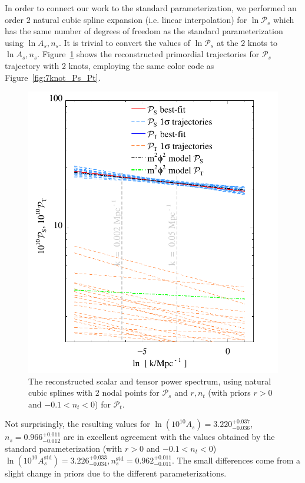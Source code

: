 \documentclass[a4paper,11pt]{article}
\newcommand{\pscalar}{{\mathcal{P}_s}}
\newcommand{\ptensor}{{\mathcal{P}_t}}
\begin{document}
In order to connect our work to the standard parameterization, we
performed an order $2$ natural cubic spline expansion (i.e. linear
interpolation) for $\ln \pscalar$ which has the same number of degrees
of freedom as the standard parameterization using $\ln A_s, n_s$. It
is trivial to convert the values of $\ln \pscalar$ at the $2$ knots to
$\ln A_s, n_s$. Figure~\ref{fig:2knot_Ps_Pt} shows the reconstructed
primordial trajectories for $\pscalar$ trajectory with 2 knots,
employing the same color code as Figure~\ref{fig:7knot_Ps_Pt}.
\begin{figure}
  \includegraphics[width=0.9\linewidth]{p2cubicspline_traj11}
  \caption{The reconstructed scalar and tensor power spectrum, using
    natural cubic splines with $2$ nodal points for $\pscalar$ and $r,
    n_t$ (with priors $r>0$ and $-0.1<n_t<0$) for
    $\ptensor$.}
  \label{fig:2knot_Ps_Pt}
\end{figure}
Not surprisingly, the resulting values for
$\ln\left(10^{10}A_s\right)=3.220^{+0.037}_{-0.036}$,
$n_s=0.966^{+0.011}_{-0.012}$ are in excellent agreement with the
values obtained by the standard parameterization (with $r>0$ and
$-0.1<n_t<0$)
$\ln\left(10^{10}A_s^{\mathrm{std}}\right)=3.226^{+0.033}_{-0.034},
n_s^{\mathrm{std}}=0.962^{+0.011}_{-0.011}$. The small differences
come from a slight change in priors due to the different
parameterizations.
\end{document}

